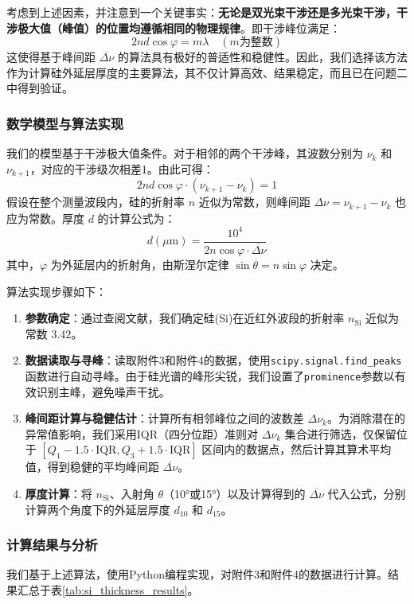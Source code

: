 \documentclass[withoutpreface,bwprint]{cumcmthesis} %
\begin{document}
考虑到上述因素，并注意到一个关键事实：\textbf{无论是双光束干涉还是多光束干涉，干涉极大值（峰值）的位置均遵循相同的物理规律}。即干涉峰位满足：
$$
    2nd\cos\varphi = m\lambda \quad (m \text{为整数})
$$
这使得基于峰间距 $\overline{\Delta\nu}$ 的算法具有极好的普适性和稳健性。因此，我们选择该方法作为计算硅外延层厚度的主要算法，其不仅计算高效、结果稳定，而且已在问题二中得到验证。

\subsubsection{数学模型与算法实现}

我们的模型基于干涉极大值条件。对于相邻的两个干涉峰，其波数分别为 $\nu_k$ 和 $\nu_{k+1}$，对应的干涉级次相差1。由此可得：
$$
    2nd\cos\varphi \cdot (\nu_{k+1} - \nu_k) = 1
$$
假设在整个测量波段内，硅的折射率 $n$ 近似为常数，则峰间距 $\Delta\nu = \nu_{k+1} - \nu_k$ 也应为常数。厚度 $d$ 的计算公式为：
$$
    d (\mu\text{m}) = \frac{10^4}{2n\cos\varphi \cdot \overline{\Delta\nu}}
$$
其中，$\varphi$ 为外延层内的折射角，由斯涅尔定律 $\sin\theta = n\sin\varphi$ 决定。

算法实现步骤如下：
\begin{enumerate}
    \item \textbf{参数确定}：通过查阅文献\cite{Green2008Silicon}，我们确定硅(Si)在近红外波段的折射率 $n_{\text{Si}}$ 近似为常数 $3.42$。
    \item \textbf{数据读取与寻峰}：读取附件3和附件4的数据，使用\texttt{scipy.signal.find\_peaks}函数进行自动寻峰。由于硅光谱的峰形尖锐，我们设置了\texttt{prominence}参数以有效识别主峰，避免噪声干扰。
    \item \textbf{峰间距计算与稳健估计}：计算所有相邻峰位之间的波数差 $\Delta\nu_k$。为消除潜在的异常值影响，我们采用IQR（四分位距）准则对 $\Delta\nu_k$ 集合进行筛选，仅保留位于 $[Q_1 - 1.5 \cdot \text{IQR}, Q_3 + 1.5 \cdot \text{IQR}]$ 区间内的数据点，然后计算其算术平均值，得到稳健的平均峰间距 $\overline{\Delta\nu}$。
    \item \textbf{厚度计算}：将 $n_{\text{Si}}$、入射角 $\theta$（10°或15°）以及计算得到的 $\overline{\Delta\nu}$ 代入公式，分别计算两个角度下的外延层厚度 $d_{10}$ 和 $d_{15}$。
\end{enumerate}

\subsubsection{计算结果与分析}

我们基于上述算法，使用Python编程实现，对附件3和附件4的数据进行计算。结果汇总于表\ref{tab:si_thickness_results}。
\end{document}
